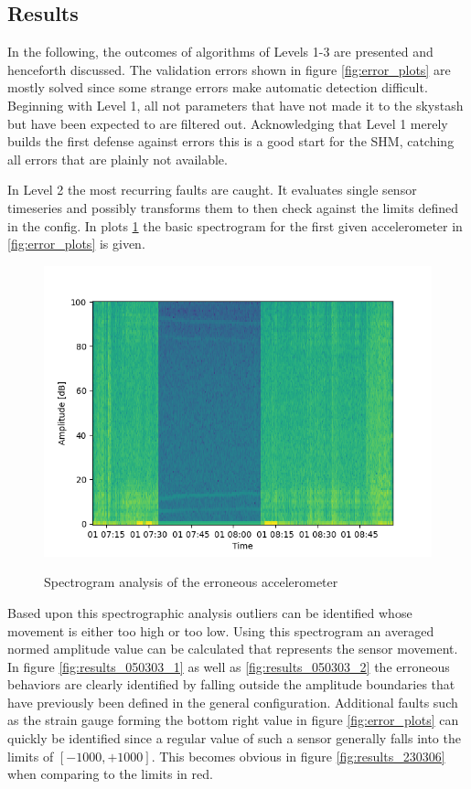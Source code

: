 \subsection{Results}


In the following, the outcomes of algorithms of Levels 1-3 are presented and henceforth discussed.
The validation errors shown in figure \ref{fig:error_plots} are mostly solved since some strange errors make automatic detection difficult.
Beginning with Level 1, all not parameters that have not made it to the skystash but have been expected to are filtered out. Acknowledging that Level 1 merely builds the first defense against errors this is a good start for the SHM, catching all errors that are plainly not available.

In Level 2 the most recurring faults are caught. It evaluates single sensor timeseries and possibly transforms them to then check against the limits defined in the config. In plots \ref{fig:results_050303_spectrogram} the basic spectrogram for the first given accelerometer in \ref{fig:error_plots} is given.
\begin{figure}
    \centering
    \includegraphics[width=.7\textwidth]{03_figures/python_functions/images/FUS_050303_spectro.png}
    \label{fig:results_050303_spectrogram}
    \caption{Spectrogram analysis of the erroneous accelerometer}
\end{figure}
Based upon this spectrographic analysis outliers can be identified whose movement is either too high or too low. Using this spectrogram an averaged normed amplitude value can be calculated that represents the sensor movement. In figure \ref{fig:results_050303_1} as well as \ref{fig:results_050303_2} the erroneous behaviors are clearly identified by falling outside the amplitude boundaries that have previously been defined in the general configuration.
Additional faults such as the strain gauge forming the bottom right value in figure \ref{fig:error_plots} can quickly be identified since a regular value of such a sensor generally falls into the limits of $[-1000, +1000]$. This becomes obvious in figure \ref{fig:results_230306} when comparing to the limits in red.
